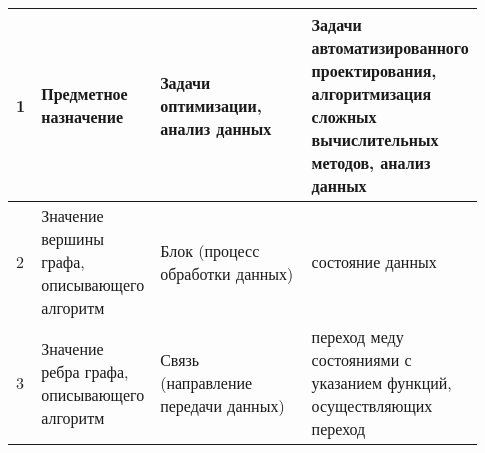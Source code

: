 \begin{landscape}
\begin{longtable}{|p{0.03\linewidth}|p{0.2\linewidth}|p{0.35\linewidth}|p{0.35\linewidth}|}
        1          & Предметное назначение                                                                      & Задачи оптимизации, анализ данных                                                                                                                                                                                                                                                                                                                                                                                                                                                                                                                                                                                                                                 & Задачи автоматизированного проектирования, алгоритмизация сложных вычислительных методов, анализ данных                                                                                                                                                                           \\
        \hline
        2          & Значение вершины графа, описывающего алгоритм                                              & Блок (процесс обработки данных)                                                                                                                                                                                                                                                                                                                                                                                                                                                                                                                                                                                                                                   & состояние данных                                                                                                                                                                                                                                                                  \\
        \hline
        3          & Значение ребра графа, описывающего алгоритм                                                & Связь (направление передачи данных)                                                                                                                                                                                                                                                                                                                                                                                                                                                                                                                                                                                                                               & переход меду состояниями с указанием функций, осуществляющих переход                                                                                                                                                                                                              \\

\end{longtable}
\end{landscape}
